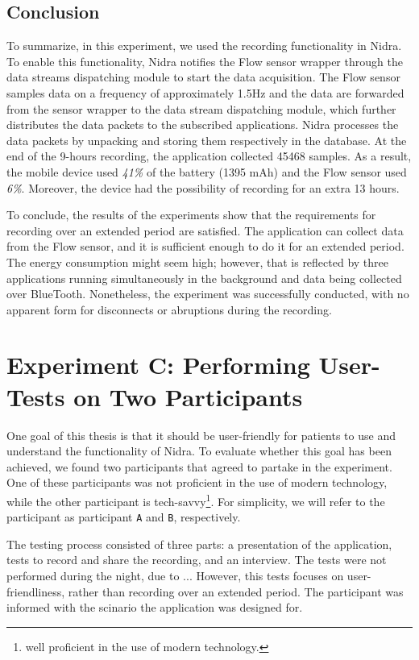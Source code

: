 \subsection{Conclusion}
To summarize, in this experiment, we used the recording functionality in Nidra. To enable this functionality, Nidra notifies the Flow sensor wrapper through the data streams dispatching module to start the data acquisition. The Flow sensor samples data on a frequency of approximately 1.5Hz and the data are forwarded from the sensor wrapper to the data stream dispatching module, which further distributes the data packets to the subscribed applications. Nidra processes the data packets by unpacking and storing them respectively in the database. At the end of the 9-hours recording, the application collected 45468 samples. As a result, the mobile device used \textit{41\%} of the battery (1395 mAh) and the Flow sensor used \textit{6\%}. Moreover, the device had the possibility of recording for an extra 13 hours.

To conclude, the results of the experiments show that the requirements for recording over an extended period are satisfied. The application can collect data from the Flow sensor, and it is sufficient enough to do it for an extended period. The energy consumption might seem high; however, that is reflected by three applications running simultaneously in the background and data being collected over BlueTooth. Nonetheless, the experiment was successfully conducted, with no apparent form for disconnects or abruptions during the recording. 

\section{Experiment C: Performing User-Tests on Two Participants}
One goal of this thesis is that it should be user-friendly for patients to use and understand the functionality of Nidra. To evaluate whether this goal has been achieved, we found two participants that agreed to partake in the experiment. One of these participants was not proficient in the use of modern technology, while the other participant is tech-savvy\footnote{well proficient in the use of modern technology.}. For simplicity, we will refer to the participant as participant \verb|A| and \verb|B|, respectively. 

The testing process consisted of three parts: a presentation of the application, tests to record and share the recording, and an interview. The tests were not performed during the night, due to ... However, this tests focuses on user-friendliness, rather than recording over an extended period. The participant was informed with the scinario the application was designed for. 

